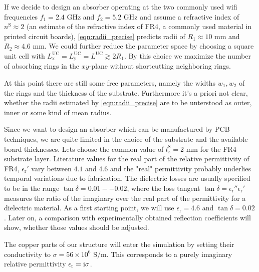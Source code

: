 If we decide to design an absorber operating at the two commonly used wifi frequencies $f_1=2.4$ GHz and $f_2=5.2$ GHz and assume a refractive index of $n^\mathrm{S}\approx 2$ (an estimate of the refractive index of FR4, a commonly used material in printed circuit boards), \cref{eqn:radii_precise} predicts radii of $R_1\approx10$ mm and $R_2\approx 4.6$ mm. We could further reduce the parameter space by choosing a square unit cell with $L^\mathrm{UC}_\mathrm{x}=L^\mathrm{UC}_\mathrm{y}=L^\mathrm{UC}\gtrsim 2R_1$. By this choice we maximize the number of absorbing rings in the $xy$-plane without shortcutting neighboring rings.

At this point there are still some free parameters, namely the widths $w_1, w_2$ of the rings and the thickness of the substrate. Furthermore it's a priori not clear, whether the radii estimated by \cref{eqn:radii_precise} are to be unterstood as outer, inner or some kind of mean radius.

Since we want to design an absorber which can be manufactured by PCB techniques, we are quite limited in the choice of the substrate and the available board thicknesses. Lets choose the common value of $l_z^\mathrm{S}=2$ mm for the FR4 substrate layer. Literature values for the real part of the relative permittivity of FR4, $\epsilon_\mathrm{r}'$ vary between $4.1$ and $4.6$ and the "real" permittivity probably underlies temporal variations due to fabrication. The dielectric losses are usually specified to be in the range $\tan \delta=0.01--0.02$, where the loss tangent $\tan\delta=\epsilon_\mathrm{r}''\epsilon_\mathrm{r}'$ measures the ratio of the imaginary over the real part of the permittivity for a dielectric material. As a first starting point, we will use $\epsilon_\mathrm{r}=4.6$ and $\tan\delta = 0.02$. Later on, a comparison with experimentally obtained reflection coefficients will show, whether those values should be adjusted.

The copper parts of our structure will enter the simulation by setting their conductivity to $\sigma=56\times 10^6$ S/m. This corresponds to a purely imaginary relative permittivity $\epsilon_\mathrm{r}= \mathrm{i} \sigma$.

